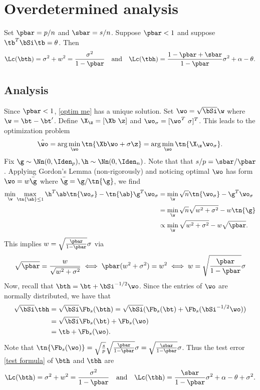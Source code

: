 \section{Overdetermined analysis}
\begin{lemma} Set $\pbar=p/n$ and $\sbar=s/n$. Suppose $\pbar<1$ and suppose $\tb^T\bSi\tb=\theta$. Then
\[
\Lc(\bth)=\sigma^2+w^2=\frac{\sigma^2}{1-\pbar}\quad\text{and}\quad \Lc(\tbh)=\frac{1-\pbar+\sbar}{1-\pbar}\sigma^2+\alpha-\theta.
\]
\end{lemma}
\subsection{Analysis}
Since $\pbar<1$, \eqref{optim me} has a unique solution. Set $\wo=\sqrt{\bSi}\w$ where $\w=\bt-\bt'$. Define $\X_\z=[\Xb~\z]$ and $\wo_\sigma=[\wo^T~\sigma]^T$. This leads to the optimization problem
\[
\hat{\wo}=\arg\min_{\wo} \tn{\Xb\wo+\sigma \z}=\arg\min_{\wo} \tn{\X_\z\wo_\sigma}.
\]
Fix $\g\sim\Nn(0,\Iden_p),\h\sim\Nn(0,\Iden_n)$. Note that that $s/p=\sbar/\pbar$. Applying Gordon's Lemma (non-rigorously) and noticing optimal $\wo$ has form $\wo=w\bar{\g}$ where $\bar{\g}=\g/\tn{\g}$, we find
\begin{align}
\min_{\w} \max_{\tn{\ab}\leq 1} \h^T\ab \tn{\wo_{\sigma}}-\tn{\ab}\g^T\wo_{\sigma}&=\min_{\w}  \sqrt{n} \tn{\wo_{\sigma}}-\g^T\wo_{\sigma}\\
&=\min_{\w}  \sqrt{n} \sqrt{w^2+\sigma^2}-w\tn{\g}\\
&\propto\min_{\w}  \sqrt{w^2+\sigma^2}-w\sqrt{\pbar}.
\end{align}
This implies $w=\sqrt{\frac{\pbar}{1-\pbar}}\sigma$ via
\[
\sqrt{\pbar}=\frac{w}{\sqrt{w^2+\sigma^2}}\iff \pbar (w^2+\sigma^2)=w^2\iff w=\sqrt{\frac{\pbar}{1-\pbar}}\sigma
\]
Now, recall that $\bth=\bt+\bSi^{-1/2}\wo$. Since the entries of $\wo$ are normally distributed, we have that
\begin{align}
\sqrt{\bSi}\tbh&=\sqrt{\bSi}\Fb_s(\bth)=\sqrt{\bSi}(\Fb_s(\bt)+\Fb_s(\bSi^{-1/2}\wo))\\
&=\sqrt{\bSi}\Fb_s(\bt)+\Fb_s(\wo)\\
&=\tb+\Fb_s(\wo).
\end{align}
Note that $\tn{\Fb_s(\wo)}=\sqrt{\frac{s}{p}}\sqrt{\frac{\pbar}{1-\pbar}}\sigma=\sqrt{\frac{\sbar}{1-\pbar}}\sigma$. Thus the test error \eqref{test formula} of $\bth$ and $\tbh$ are
\[
\Lc(\bth)=\sigma^2+w^2=\frac{\sigma^2}{1-\pbar}\quad\text{and}\quad \Lc(\tbh)=\frac{\sbar}{1-\pbar}\sigma^2+\alpha-\theta+\sigma^2.
\]
